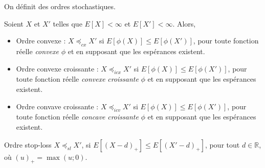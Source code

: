 On définit des ordres stochastiques. 

\begin{definition}{}{}
	Soient $X$ et $X'$ telles que $E[X] < \infty$ et $E[X'] < \infty$. Alors, 
	\begin{itemize}
		\item Ordre convexe : $X\preceq_{cx} X'$ si $E[\phi(X)] \leq E[\phi(X')]$, pour toute fonction réelle \textit{convexe} $\phi$ et en supposant que les espérances existent. 
		\item Ordre convexe croissante : $X\preceq_{icx} X'$ si $E[\phi(X)] \leq E[\phi(X')]$, pour toute fonction réelle \textit{convexe} \textit{croissante} $\phi$ et en supposant que les espérances existent. 
		\item Ordre convave croissante : $X\preceq_{icv} X'$ si $E[\phi(X)] \leq E[\phi(X')]$, pour toute fonction réelle \textit{concave} \textit{croissante} $\phi$ et en supposant que les espérances existent. 
	\end{itemize}
\end{definition}

\begin{definition}{Ordre stop-loss}{}
	$X\preceq_{sl}X'$, si $E[(X-d)_+] \leq E[(X'-d)_+]$, pour tout $d\in \mathbb{R}$, où $(u)_+ = \max(u;0)$.
\end{definition}
































